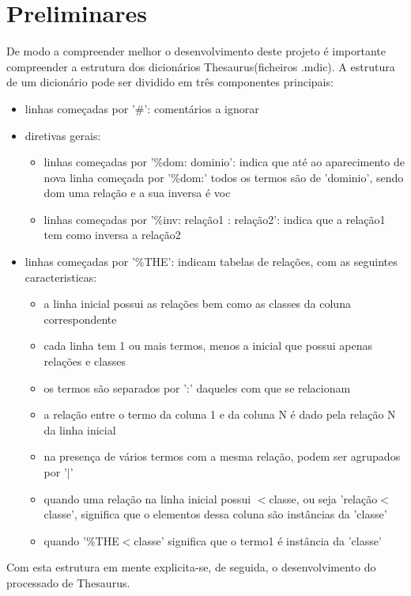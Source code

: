 \documentclass{llncs}
\begin{document}
\section{Preliminares}
De modo a compreender melhor o desenvolvimento deste projeto é importante compreender a estrutura dos dicionários Thesaurus(ficheiros .mdic). 
A estrutura de um dicionário pode ser dividido em três componentes principais:
\begin{itemize}
    \item linhas começadas por '\#': comentários a ignorar
    \item diretivas gerais:
        \begin{itemize}
            \item linhas começadas por '\%dom: dominio': indica que até ao aparecimento de nova linha começada por '\%dom:' todos os termos são de 'dominio', sendo dom uma relação e a sua inversa é voc
            \item linhas começadas por '\%inv: relação1 : relação2': indica que a relação1 tem como inversa a relação2
        \end{itemize}
    \item linhas começadas por '\%THE': indicam tabelas de relações, com as seguintes caracteristicas:
        \begin{itemize}
            \item a linha inicial possui as relações bem como as classes da coluna correspondente
            \item cada linha tem 1 ou mais termos, menos a inicial que possui apenas relações e classes
            \item os termos são separados por ':' daqueles com que se relacionam
            \item a relação entre o termo da coluna 1 e da coluna N é dado pela relação N da linha inicial
            \item na presença de vários termos com a mesma relação, podem ser agrupados por '$|$'
            \item quando uma relação na linha inicial possui $<$classe, ou seja 'relação$<$classe', significa que o elementos dessa coluna são instâncias da 'classe'
            \item quando '\%THE$<$classe' significa que o termo1 é instância da 'classe'
        \end{itemize}
\end{itemize}
Com esta estrutura em mente explicita-se, de seguida, o desenvolvimento do processado de Thesaurus.
\end{document}

